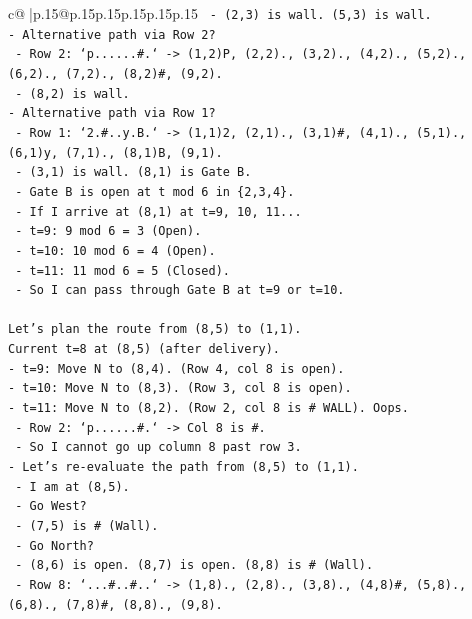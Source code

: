 \documentclass{article}
\begin{document}
{\begin{supertabular}{c@{$\;$}|p{.15\linewidth}@{}p{.15\linewidth}p{.15\linewidth}p{.15\linewidth}p{.15\linewidth}p{.15\linewidth}}
{{{\texttt{  {-} (2,3) is wall. (5,3) is wall.} \\
\texttt{{-} Alternative path via Row 2?} \\
\texttt{  {-} Row 2: `p......\#.` {-}> (1,2)P, (2,2)., (3,2)., (4,2)., (5,2)., (6,2)., (7,2)., (8,2)\#, (9,2).} \\
\texttt{  {-} (8,2) is wall.} \\
\texttt{{-} Alternative path via Row 1?} \\
\texttt{  {-} Row 1: `2.\#..y.B.` {-}> (1,1)2, (2,1)., (3,1)\#, (4,1)., (5,1)., (6,1)y, (7,1)., (8,1)B, (9,1).} \\
\texttt{  {-} (3,1) is wall. (8,1) is Gate B.} \\
\texttt{  {-} Gate B is open at t mod 6 in \{2,3,4\}.} \\
\texttt{  {-} If I arrive at (8,1) at t=9, 10, 11...} \\
\texttt{    {-} t=9: 9 mod 6 = 3 (Open).} \\
\texttt{    {-} t=10: 10 mod 6 = 4 (Open).} \\
\texttt{    {-} t=11: 11 mod 6 = 5 (Closed).} \\
\texttt{  {-} So I can pass through Gate B at t=9 or t=10.} \\
\\ 
\texttt{Let's plan the route from (8,5) to (1,1).} \\
\texttt{Current t=8 at (8,5) (after delivery).} \\
\texttt{{-} t=9: Move N to (8,4). (Row 4, col 8 is open).} \\
\texttt{{-} t=10: Move N to (8,3). (Row 3, col 8 is open).} \\
\texttt{{-} t=11: Move N to (8,2). (Row 2, col 8 is \# WALL). Oops.} \\
\texttt{  {-} Row 2: `p......\#.` {-}> Col 8 is \#.} \\
\texttt{  {-} So I cannot go up column 8 past row 3.} \\
\texttt{{-} Let's re{-}evaluate the path from (8,5) to (1,1).} \\
\texttt{  {-} I am at (8,5).} \\
\texttt{  {-} Go West?} \\
\texttt{    {-} (7,5) is \# (Wall).} \\
\texttt{  {-} Go North?} \\
\texttt{    {-} (8,6) is open. (8,7) is open. (8,8) is \# (Wall).} \\
\texttt{    {-} Row 8: `...\#..\#..` {-}> (1,8)., (2,8)., (3,8)., (4,8)\#, (5,8)., (6,8)., (7,8)\#, (8,8)., (9,8).} \\
}}}
\end{supertabular}}
\end{document}
